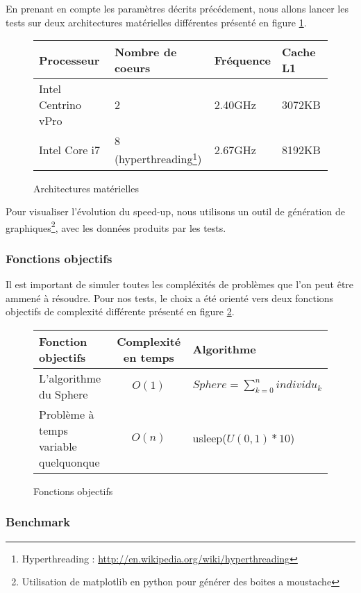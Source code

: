 En prenant en compte les paramètres décrits précédement, nous allons lancer les tests sur deux architectures matérielles différentes présenté en figure \ref{fig:architectures}.\\

\begin{figure}[here]
  \centering
  \begin{tabular}{ | l | l | l | l |}
    \hline
    \textbf{Processeur} & \textbf{Nombre de coeurs} & \textbf{Fréquence} & \textbf{Cache L1}\\\hline
    Intel Centrino vPro & 2 & 2.40GHz & 3072KB\\\hline
    Intel Core i7 & 8 (hyperthreading\footnote{Hyperthreading : \url{http://en.wikipedia.org/wiki/hyperthreading}}) & 2.67GHz & 8192KB\\\hline
  \end{tabular}
  \caption{Architectures matérielles}
  \label{fig:architectures}
\end{figure}

Pour visualiser l'évolution du speed-up, nous utilisons un outil de génération de graphiques\footnote{Utilisation de matplotlib en python pour générer des boites a moustache}, avec les données produits par les tests.

\subsubsection{Fonctions objectifs}

Il est important de simuler toutes les compléxités de problèmes que l'on peut être ammené à résoudre. Pour nos tests, le choix a été orienté vers deux fonctions objectifs de complexité différente présenté en figure \ref{fig:objectifs}.

\begin{figure}[here]
  \centering
  \begin{tabular}{ | l | c | l |}
    \hline
    \textbf{Fonction objectifs} & \textbf{Complexité en temps} & \textbf{Algorithme}\\\hline
    L'algorithme du Sphere & $O(1)$ & $Sphere = \sum_{k=0}^n individu_k$\\\hline
    Problème à temps variable quelquonque & $O(n)$ & usleep($U(0,1) * 10$)\\\hline
  \end{tabular}
  \caption{Fonctions objectifs}
  \label{fig:objectifs}
\end{figure}

\subsubsection{Benchmark}

